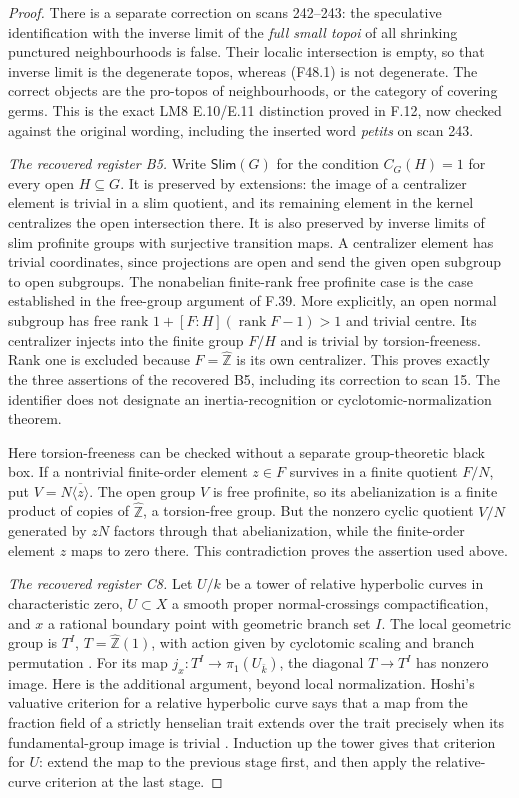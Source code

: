 \begin{proof}
There is a separate correction on scans 242--243: the speculative
identification with the inverse limit of the \emph{full small topoi}
of all shrinking punctured neighbourhoods is false. Their localic
intersection is empty, so that inverse limit is the degenerate topos,
whereas (F48.1) is not degenerate. The correct objects are the
pro-topos of neighbourhoods, or the category of covering germs.
This is the exact LM8 E.10/E.11 distinction proved in F.12, now
checked against the original wording, including the inserted word
\emph{petits} on scan 243.

\emph{The recovered register B5.}
Write $\mathsf{Slim}(G)$ for the condition
$C_G(H)=1$ for every open $H\subseteq G$. It is preserved by
extensions: the image of a centralizer element is trivial in a slim
quotient, and its remaining element in the kernel centralizes the
open intersection there. It is also preserved by inverse limits of
slim profinite groups with surjective transition maps. A centralizer
element has trivial coordinates, since projections are open and
send the given open subgroup to open subgroups.
The nonabelian finite-rank free profinite case is the case established
in the free-group argument of F.39. More explicitly, an open normal
subgroup has free rank $1+[F:H](\operatorname{rank}F-1)>1$ and trivial
centre. Its centralizer injects into the finite group $F/H$ and is
trivial by torsion-freeness. Rank one is excluded because
$F=\widehat{\mathbb Z}$ is its own centralizer. This proves exactly
the three assertions of the recovered B5, including its correction
to scan 15. The identifier does not designate an inertia-recognition
or cyclotomic-normalization theorem.

Here torsion-freeness can be checked without a separate group-theoretic
black box. If a nontrivial finite-order element $z\in F$ survives in a
finite quotient $F/N$, put $V=N\overline{\langle z\rangle}$. The open
group $V$ is free profinite, so its abelianization is a finite product
of copies of $\widehat{\mathbb Z}$, a torsion-free group. But the
nonzero cyclic quotient $V/N$ generated by $zN$ factors through that
abelianization, while the finite-order element $z$ maps to zero there.
This contradiction proves the assertion used above.

\emph{The recovered register C8.}
Let $U/k$ be a tower of relative hyperbolic curves in characteristic
zero, $U\subset X$ a smooth proper normal-crossings compactification,
and $x$ a rational boundary point with geometric branch set $I$.
The local geometric group is $T^I$, $T=\widehat{\mathbb Z}(1)$,
with action given by cyclotomic scaling and branch permutation
\citep[Proposition~3.4]{CarlsonCorwin2026}. For its map
$j_x:T^I\to\pi_1(U_{\bar k})$, the diagonal $T\to T^I$ has nonzero
image. Here is the additional argument, beyond local normalization.
Hoshi's valuative criterion for a relative hyperbolic curve says that
a map from the fraction field of a strictly henselian trait extends
over the trait precisely when its fundamental-group image is trivial
\citep[Lemma~2.8, pp.~175--176]{Hoshi2014}. Induction up the tower
gives that criterion for $U$: extend the map to the previous stage
first, and then apply the relative-curve criterion at the last stage.


\end{proof}
